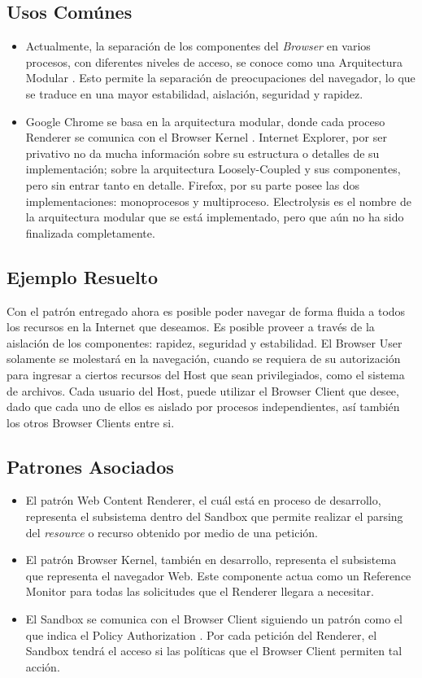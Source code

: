 \subsection{Usos Comúnes}
\begin{itemize}
	\item Actualmente, la separación de los componentes del \textit{Browser} en varios procesos, con diferentes niveles de acceso, se conoce como una Arquitectura Modular \cite{Vrbanec2013}. Esto permite la separación de preocupaciones del navegador, lo que se traduce en una mayor estabilidad, aislación, seguridad y rapidez.
	\item Google Chrome se basa en la arquitectura modular, donde cada proceso Renderer se comunica con el Browser Kernel \cite{multiProcGC}. Internet Explorer, por ser privativo no da mucha información sobre su estructura o detalles de su implementación; \cite{Crowley2010} sobre la arquitectura Loosely-Coupled \cite{IE8-LCIE} y sus componentes, pero sin entrar tanto en detalle. Firefox, por su parte posee las dos implementaciones: monoprocesos y multiproceso. Electrolysis es el nombre de la arquitectura modular que se está implementado, pero que aún no ha sido finalizada completamente.
\end{itemize}
\subsection{Ejemplo Resuelto}
Con el patrón entregado ahora es posible poder navegar de forma fluida a todos los recursos en la Internet que deseamos. Es posible proveer a través de la aislación de los componentes: rapidez, seguridad y estabilidad. El Browser User solamente se molestará en la navegación, cuando se requiera de su autorización para ingresar a ciertos recursos del Host que sean privilegiados, como el sistema de archivos. Cada usuario del Host, puede utilizar el Browser Client que desee, dado que cada uno de ellos es aislado por procesos independientes, así también los otros Browser Clients entre si.


\subsection{Patrones Asociados}
\begin{itemize}
	\item El patrón Web Content Renderer, el cuál está en proceso de desarrollo, representa el subsistema dentro del Sandbox que permite realizar el parsing del \textit{resource} o recurso obtenido por medio de una petición.
	\item El patrón Browser Kernel, también en desarrollo, representa el subsistema que representa el navegador Web. Este componente actua como un Reference Monitor \cite{fernandez2013security} para todas las solicitudes que el Renderer llegara a necesitar.
	\item El Sandbox se comunica con el Browser Client siguiendo un patrón como el que indica el Policy Authorization \cite{fernandez2013security}. Por cada petición del Renderer, el Sandbox tendrá el acceso si las políticas que el Browser Client permiten tal acción.
\end{itemize}
